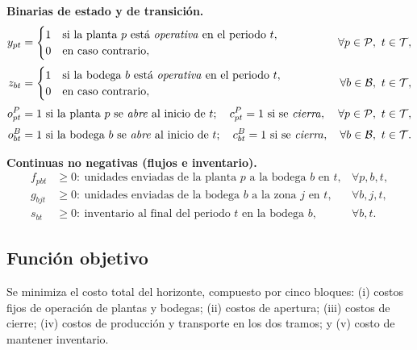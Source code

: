 \documentclass[11pt]{article}
\begin{document}
\noindent\textbf{Binarias de estado y de transición.}
\begin{align*}
y_{pt} &=
\begin{cases}
1 & \text{si la planta } p \text{ está \emph{operativa} en el periodo } t,\\
0 & \text{en caso contrario},
\end{cases}
& \forall p\in\mathcal{P},\ t\in\mathcal{T},\\[2pt]
z_{bt} &=
\begin{cases}
1 & \text{si la bodega } b \text{ está \emph{operativa} en el periodo } t,\\
0 & \text{en caso contrario},
\end{cases}
& \forall b\in\mathcal{B},\ t\in\mathcal{T},\\[2pt]
o^{P}_{pt} &= 1 \text{ si la planta } p \text{ se \emph{abre} al inicio de } t;\quad
c^{P}_{pt} = 1 \text{ si se \emph{cierra}}, & \forall p\in\mathcal{P},\ t\in\mathcal{T},\\[2pt]
o^{B}_{bt} &= 1 \text{ si la bodega } b \text{ se \emph{abre} al inicio de } t;\quad
c^{B}_{bt} = 1 \text{ si se \emph{cierra}}, & \forall b\in\mathcal{B},\ t\in\mathcal{T}.
\end{align*}

\noindent\textbf{Continuas no negativas (flujos e inventario).}
\begin{align*}
f_{pbt} &\ge 0:\ \text{unidades enviadas de la planta } p \text{ a la bodega } b \text{ en } t, & \forall p,b,t,\\
g_{bjt} &\ge 0:\ \text{unidades enviadas de la bodega } b \text{ a la zona } j \text{ en } t, & \forall b,j,t,\\
s_{bt} &\ge 0:\ \text{inventario al final del periodo } t \text{ en la bodega } b, & \forall b,t.
\end{align*}

\subsection*{Función objetivo}

Se minimiza el costo total del horizonte, compuesto por cinco bloques: (i) costos fijos de operación de plantas y bodegas; (ii) costos de apertura; (iii) costos de cierre; (iv) costos de producción y transporte en los dos tramos; y (v) costo de mantener inventario.
\end{document}
